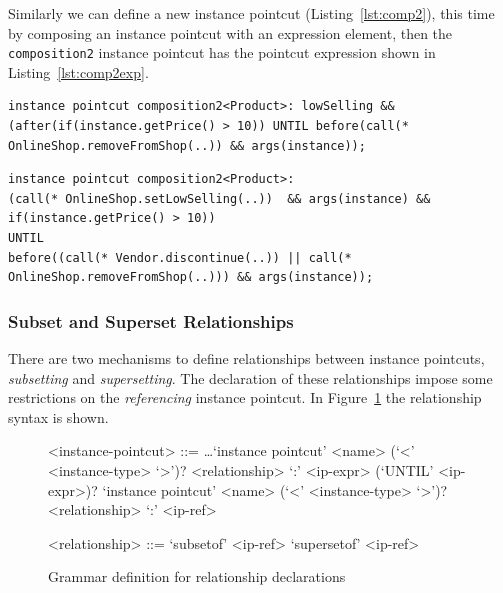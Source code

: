 \documentclass{llncs}
\begin{document}
Similarly we can define a new instance pointcut (Listing~\ref{lst:comp2}), this time by composing an instance pointcut with an expression element, then the \texttt{composition2} instance pointcut has the pointcut expression shown in Listing~\ref{lst:comp2exp}.

\begin{lstlisting}[float=h!, caption={An instance pointcut and an expression is composed}, label={lst:comp2}]
instance pointcut composition2<Product>: lowSelling && (after(if(instance.getPrice() > 10)) UNTIL before(call(* OnlineShop.removeFromShop(..)) && args(instance));
\end{lstlisting}


\begin{lstlisting}[float=h!, caption={The composition2 instance pointcut after composition}, label={lst:comp2exp}]
instance pointcut composition2<Product>: 
(call(* OnlineShop.setLowSelling(..))  && args(instance) && if(instance.getPrice() > 10)) 
UNTIL
before((call(* Vendor.discontinue(..)) || call(* OnlineShop.removeFromShop(..))) && args(instance));
\end{lstlisting}



\subsubsection{Subset and Superset Relationships}
There are two mechanisms to define relationships between instance pointcuts, \emph{subsetting} and \emph{supersetting}. The declaration of these relationships impose some restrictions on the \emph{referencing} instance pointcut. In Figure~\ref{fig:grammar3} the relationship syntax is shown.

\begin{figure}[h]
\begin{grammar}
<instance-pointcut> ::= \ldots \alt `instance pointcut' <name> (`<' <instance-type> `>')? <relationship> `:' <ip-expr> (`UNTIL' <ip-expr>)?  \alt
	`instance pointcut' <name> (`<' <instance-type> `>')? <relationship> `:' <ip-ref>

<relationship> ::= `subsetof' <ip-ref> \alt `supersetof' <ip-ref>
\end{grammar}
\caption{Grammar definition for relationship declarations}
\label{fig:grammar3}
\end{figure}
\end{document}
